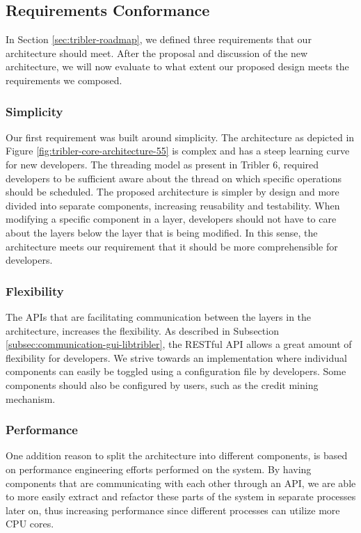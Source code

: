 
\subsection{Requirements Conformance}
In Section \ref{sec:tribler-roadmap}, we defined three requirements that our architecture should meet. After the proposal and discussion of the new architecture, we will now evaluate to what extent our proposed design meets the requirements we composed.

\subsubsection{\textbf{Simplicity}}
Our first requirement was built around simplicity. The architecture as depicted in Figure \ref{fig:tribler-core-architecture-55} is complex and has a steep learning curve for new developers. The threading model as present in Tribler 6, required developers to be sufficient aware about the thread on which specific operations should be scheduled. The proposed architecture is simpler by design and more divided into separate components, increasing reusability and testability. When modifying a specific component in a layer, developers should not have to care about the layers below the layer that is being modified. In this sense, the architecture meets our requirement that it should be more comprehensible for developers.

\subsubsection{\textbf{Flexibility}}
The APIs that are facilitating communication between the layers in the architecture, increases the flexibility. As described in Subsection \ref{subsec:communication-gui-libtribler}, the RESTful API allows a great amount of flexibility for developers. We strive towards an implementation where individual components can easily be toggled using a configuration file by developers. Some components should also be configured by users, such as the credit mining mechanism.

\subsubsection{\textbf{Performance}}
One addition reason to split the architecture into different components, is based on performance engineering efforts performed on the system. By having components that are communicating with each other through an API, we are able to more easily extract and refactor these parts of the system in separate processes later on, thus increasing performance since different processes can utilize more CPU cores.